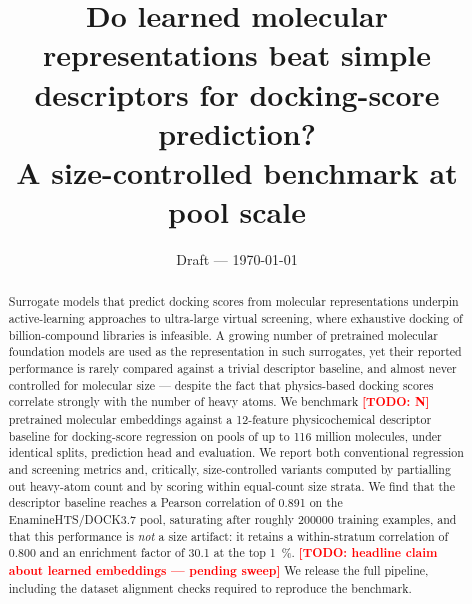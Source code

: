 \documentclass[11pt]{article}
\title{\bfseries Do learned molecular representations beat simple descriptors
for docking-score prediction?\\[0.3em]
\large A size-controlled benchmark at pool scale}
\author[1]{\todo{author list}}
\affil[1]{\todo{affiliation}}
\date{Draft --- \today}
\newcommand{\todo}[1]{\textcolor{red}{\textbf{[TODO: #1]}}}
\newcommand{\todo}[1]{}
\begin{document}
\maketitle

\begin{abstract}
Surrogate models that predict docking scores from molecular representations
underpin active-learning approaches to ultra-large virtual screening, where
exhaustive docking of billion-compound libraries is infeasible. A growing
number of pretrained molecular foundation models are used as the representation
in such surrogates, yet their reported performance is rarely compared against a
trivial descriptor baseline, and almost never controlled for molecular size ---
despite the fact that physics-based docking scores correlate strongly with the
number of heavy atoms. We benchmark \todo{N} pretrained molecular embeddings
against a \num{12}-feature physicochemical descriptor baseline for docking-score
regression on pools of up to \num{116} million molecules, under identical
splits, prediction head and evaluation. We report both conventional regression
and screening metrics and, critically, size-controlled variants computed by
partialling out heavy-atom count and by scoring within equal-count size strata.
We find that the descriptor baseline reaches a Pearson correlation of
\num{0.891} on the EnamineHTS/DOCK3.7 pool, saturating after roughly
\num{200000} training examples, and that this performance is \emph{not} a size
artifact: it retains a within-stratum correlation of \num{0.800} and an
enrichment factor of \num{30.1} at the top \SI{1}{\percent}.
\todo{headline claim about learned embeddings --- pending sweep}
We release the full pipeline, including the dataset alignment checks required
to reproduce the benchmark.
\end{abstract}












\end{document}
